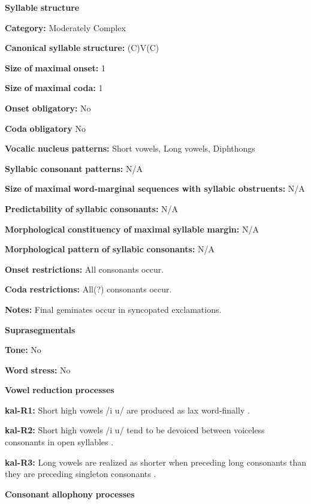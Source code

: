 \begin{styleBody}
\textbf{Syllable} \textbf{structure}

\textbf{Category:} Moderately Complex

\textbf{Canonical} \textbf{syllable} \textbf{structure:} (C)V(C) \citep[338-9]{Fortescue1984}

\textbf{Size} \textbf{of} \textbf{maximal} \textbf{onset:} 1

\textbf{Size} \textbf{of} \textbf{maximal} \textbf{coda:} 1

\textbf{Onset} \textbf{obligatory:} No

\textbf{Coda} \textbf{obligatory} No

\textbf{Vocalic} \textbf{nucleus} \textbf{patterns:} Short vowels, Long vowels, Diphthongs

\textbf{Syllabic} \textbf{consonant} \textbf{patterns:} N/A

\textbf{Size} \textbf{of} \textbf{maximal} \textbf{word{}-marginal sequences with syllabic obstruents:} N/A

\textbf{Predictability} \textbf{of} \textbf{syllabic} \textbf{consonants:} N/A

\textbf{Morphological} \textbf{constituency} \textbf{of} \textbf{maximal} \textbf{syllable} \textbf{margin:} N/A

\textbf{Morphological} \textbf{pattern} \textbf{of} \textbf{syllabic} \textbf{consonants:} N/A

\textbf{Onset} \textbf{restrictions:} All consonants occur.

\textbf{Coda} \textbf{restrictions:} All(?) consonants occur.

\textbf{Notes:} Final geminates occur in syncopated exclamations.

\textbf{Suprasegmentals}

\textbf{Tone:} No

\textbf{Word} \textbf{stress:} No

\textbf{Vowel} \textbf{reduction} \textbf{processes}

\textbf{kal-R1:}  Short high vowels /i u/ are produced as lax word-finally \citep[56-63]{Hagerup2011}.

\textbf{kal-R2:} Short high vowels /i u/ tend to be devoiced between voiceless consonants in open syllables \citep[335]{Fortescue1984}.

\textbf{kal-R3:} Long vowels are realized as shorter when preceding long consonants than they are preceding singleton consonants \citep[65]{Jacobsen2000}.

\textbf{Consonant} \textbf{allophony} \textbf{processes}


\end{styleBody}
